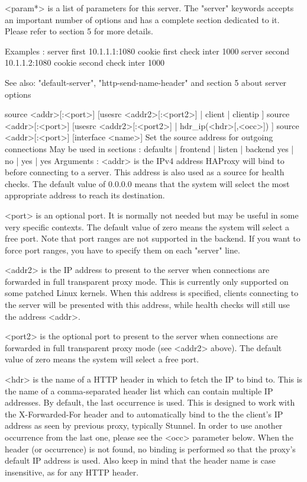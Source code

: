     <param*>  is a list of parameters for this server. The "server" keywords
              accepts an important number of options and has a complete section
              dedicated to it. Please refer to section 5 for more details.

  Examples :
        server first  10.1.1.1:1080 cookie first  check inter 1000
        server second 10.1.1.2:1080 cookie second check inter 1000

  See also: "default-server", "http-send-name-header" and section 5 about
             server options


source <addr>[:<port>] [usesrc { <addr2>[:<port2>] | client | clientip } ]
source <addr>[:<port>] [usesrc { <addr2>[:<port2>] | hdr_ip(<hdr>[,<occ>]) } ]
source <addr>[:<port>] [interface <name>]
  Set the source address for outgoing connections
  May be used in sections :   defaults | frontend | listen | backend
                                 yes   |    no    |   yes  |   yes
  Arguments :
    <addr>    is the IPv4 address HAProxy will bind to before connecting to a
              server. This address is also used as a source for health checks.
              The default value of 0.0.0.0 means that the system will select
              the most appropriate address to reach its destination.

    <port>    is an optional port. It is normally not needed but may be useful
              in some very specific contexts. The default value of zero means
              the system will select a free port. Note that port ranges are not
              supported in the backend. If you want to force port ranges, you
              have to specify them on each "server" line.

    <addr2>   is the IP address to present to the server when connections are
              forwarded in full transparent proxy mode. This is currently only
              supported on some patched Linux kernels. When this address is
              specified, clients connecting to the server will be presented
              with this address, while health checks will still use the address
              <addr>.

    <port2>   is the optional port to present to the server when connections
              are forwarded in full transparent proxy mode (see <addr2> above).
              The default value of zero means the system will select a free
              port.

    <hdr>     is the name of a HTTP header in which to fetch the IP to bind to.
              This is the name of a comma-separated header list which can
              contain multiple IP addresses. By default, the last occurrence is
              used. This is designed to work with the X-Forwarded-For header
              and to automatically bind to the the client's IP address as seen
              by previous proxy, typically Stunnel. In order to use another
              occurrence from the last one, please see the <occ> parameter
              below. When the header (or occurrence) is not found, no binding
              is performed so that the proxy's default IP address is used. Also
              keep in mind that the header name is case insensitive, as for any
              HTTP header.

